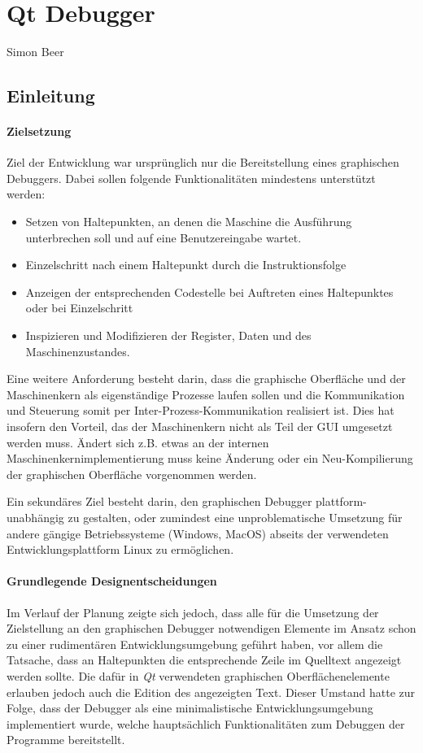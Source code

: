 \section{Qt Debugger}
\begin{flushright}
Simon Beer
\end{flushright}

\subsection{Einleitung}

\paragraph{Zielsetzung}
Ziel der Entwicklung war ursprünglich nur die Bereitstellung eines graphischen Debuggers. Dabei sollen folgende Funktionalitäten mindestens unterstützt werden:

\begin{itemize}
	\item Setzen von Haltepunkten, an denen die Maschine die Ausführung unterbrechen soll und auf eine Benutzereingabe wartet.
	\item Einzelschritt nach einem Haltepunkt durch die Instruktionsfolge
	\item Anzeigen der entsprechenden Codestelle bei Auftreten eines Haltepunktes oder bei Einzelschritt
	\item Inspizieren und Modifizieren der Register, Daten und des Maschinenzustandes.
\end{itemize}

Eine weitere Anforderung besteht darin, dass die graphische Oberfläche und der Maschinenkern als eigenständige Prozesse laufen sollen und die Kommunikation und Steuerung somit per Inter-Prozess-Kommunikation realisiert ist. Dies hat insofern den Vorteil, das der Maschinenkern nicht als Teil der GUI umgesetzt werden muss. Ändert sich z.B. etwas an der internen Maschinenkernimplementierung muss keine Änderung oder ein Neu-Kompilierung der graphischen Oberfläche vorgenommen werden.

Ein sekundäres Ziel besteht darin, den graphischen Debugger plattform-unabhängig zu gestalten, oder zumindest eine unproblematische Umsetzung für andere gängige Betriebssysteme (Windows, MacOS) abseits der verwendeten Entwicklungsplattform Linux zu ermöglichen.

\paragraph{Grundlegende Designentscheidungen}
Im Verlauf der Planung zeigte sich jedoch, dass alle für die Umsetzung der Zielstellung an den graphischen Debugger notwendigen Elemente im Ansatz schon zu einer rudimentären Entwicklungsumgebung geführt haben, vor allem die Tatsache, dass an Haltepunkten die entsprechende Zeile im Quelltext angezeigt werden sollte. Die dafür in \emph{Qt} verwendeten graphischen Oberflächenelemente erlauben jedoch auch die Edition des angezeigten Text. Dieser Umstand hatte zur Folge, dass der Debugger als eine minimalistische Entwicklungsumgebung  implementiert wurde, welche hauptsächlich Funktionalitäten zum Debuggen der Programme bereitstellt. 

